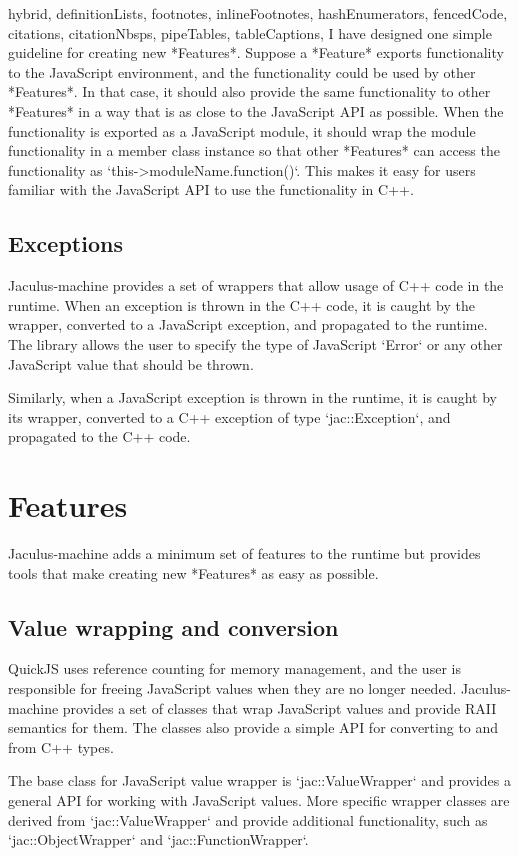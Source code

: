 \documentclass[
  digital,
  oneside,
  nosansbold,
  nocolorbold,
  lof,
  lot
]{fithesis4}
\begin{document}
\begin{markdown*}{%
  hybrid,
  definitionLists,
  footnotes,
  inlineFootnotes,
  hashEnumerators,
  fencedCode,
  citations,
  citationNbsps,
  pipeTables,
  tableCaptions,
}
I have designed one simple guideline for creating new *Features*. Suppose a *Feature* exports functionality to the JavaScript environment, and the functionality could be used by other *Features*. In that case, it should also provide the same functionality to other *Features* in a way that is as close to the JavaScript API as possible. When the functionality is exported as a JavaScript module, it should wrap the module functionality in a member class instance so that other *Features* can access the functionality as `this->moduleName.function()`. This makes it easy for users familiar with the JavaScript API to use the functionality in C++.

\subsection{Exceptions}

Jaculus-machine provides a set of wrappers that allow usage of C++ code in the runtime. When an exception is thrown in the C++ code, it is caught by the wrapper, converted to a JavaScript exception, and propagated to the runtime. The library allows the user to specify the type of JavaScript `Error` or any other JavaScript value that should be thrown.

Similarly, when a JavaScript exception is thrown in the runtime, it is caught by its wrapper, converted to a C++ exception of type `jac::Exception`, and propagated to the C++ code.


\section{Features}

Jaculus-machine adds a minimum set of features to the runtime but provides tools that make creating new *Features* as easy as possible.

\subsection{Value wrapping and conversion}

QuickJS uses reference counting for memory management, and the user is responsible for freeing JavaScript values when they are no longer needed. Jaculus-machine provides a set of classes that wrap JavaScript values and provide RAII semantics for them. The classes also provide a simple API for converting to and from C++ types.

The base class for JavaScript value wrapper is `jac::ValueWrapper` and provides a general API for working with JavaScript values. More specific wrapper classes are derived from `jac::ValueWrapper` and provide additional functionality, such as `jac::ObjectWrapper` and `jac::FunctionWrapper`.


\end{markdown*}
\end{document}
